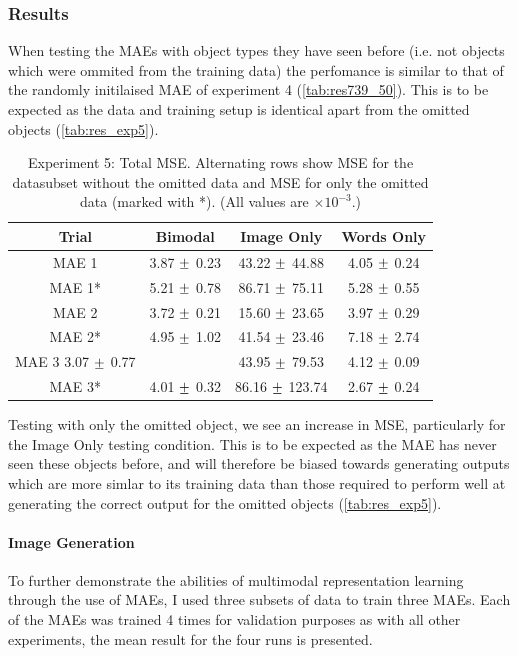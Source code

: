 \subsubsection{Results}

When testing the \acp{MAE} with object types they have seen before (i.e. not objects which were ommited from the training data) the perfomance is similar to that of the randomly initilaised \ac{MAE} of experiment 4 (\autoref{tab:res739_50}). This is to be expected as the data and training setup is identical apart from the omitted objects (\autoref{tab:res_exp5}).

\begin{table}[h!]
\centering
	\begin{tabular}{|c|c|c|c|}
	\hline
\textbf{Trial} & 	\textbf{Bimodal} & 	\textbf{Image Only} 	& 	\textbf{Words Only} \\ \hline
MAE 1	&	3.87	$\mypm$	0.23	&	43.22	$\mypm$	44.88	&	4.05	$\mypm$	0.24	\\ \hline
MAE 1*	&	5.21	$\mypm$	0.78	&	86.71	$\mypm$	75.11	&	5.28	$\mypm$	0.55	\\ \hline
MAE 2	&	3.72	$\mypm$	0.21	&	15.60	$\mypm$	23.65	&	3.97	$\mypm$	0.29	\\ \hline
MAE 2*	&	4.95	$\mypm$	1.02	&	41.54	$\mypm$	23.46	&	7.18	$\mypm$	2.74	\\ \hline
MAE 3	3.07	$\mypm$	0.77 &		&	43.95	$\mypm$	79.53	&	4.12	$\mypm$	0.09	\\ \hline
MAE 3*	&	4.01	$\mypm$	0.32	&	86.16	$\mypm$	123.74	&	2.67	$\mypm$	0.24	\\ \hline
\end{tabular}
\caption{Experiment 5: Total MSE. Alternating rows show MSE for the datasubset without the omitted data and MSE for only the omitted data (marked with *). (All values are $\times10^{-3}$.)}
\label{tab:res_exp5}
\end{table}

Testing with only the omitted object, we see an increase in \ac{MSE}, particularly for the Image Only testing condition. This is to be expected as the MAE has never seen these objects before, and will therefore be biased towards generating outputs which are more simlar to its training data than those required to perform well at generating the correct output for the omitted objects (\autoref{tab:res_exp5}).

\paragraph{Image Generation}
To further demonstrate the abilities of multimodal representation learning through the use of \acp{MAE}, I used three subsets of data to train three \acp{MAE}. Each of the MAEs was trained 4 times for validation purposes as with all other experiments, the mean result for the four runs is presented.

